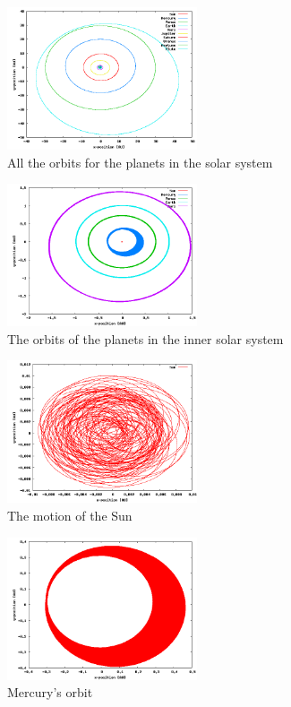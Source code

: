 \documentclass[a4wide,12pt]{article}
\begin{document}
\begin{figure}[p]
 \includegraphics[width=0.5\textwidth]{solarsystem}
 \caption{All the orbits for the planets in the solar system}
 \label{fig:17} 
\end{figure}

\begin{figure}[p]
 \includegraphics[width=0.5\textwidth]{innersolar}
 \caption{The orbits of the planets in the inner solar system}
 \label{fig:18} 
\end{figure}

\begin{figure}[p]
 \includegraphics[width=0.5\textwidth]{sun}
 \caption{The motion of the Sun}
 \label{fig:19} 
\end{figure}

\begin{figure}[p]
 \includegraphics[width=0.5\textwidth]{Mercuryrel}
 \caption{Mercury's orbit}
 \label{fig:20} 
\end{figure}
\end{document}
